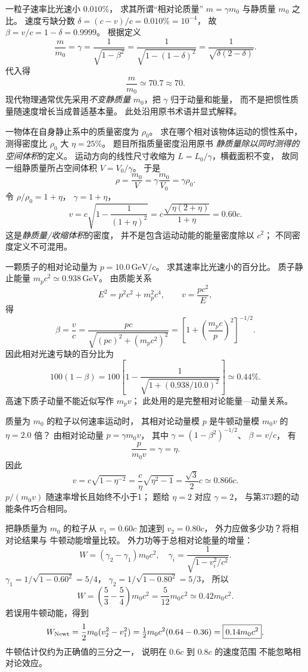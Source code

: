 一粒子速率比光速小 $0.010\%$，
求其所谓“相对论质量”
$m=\gamma m_0$ 与静质量 $m_0$ 之比。
\exsolution
速度亏缺分数
$\delta=(c-v)/c=0.010\%=10^{-4}$，
故 $\beta=v/c=1-\delta=0.9999$。
根据定义
\[
\frac{m}{m_0}=\gamma
=\frac1{\sqrt{1-\beta^2}}
=\frac1{\sqrt{1-(1-\delta)^2}}
=\frac1{\sqrt{\delta(2-\delta)}}.
\]
代入得
\[
\boxed{\frac{m}{m_0}\simeq70.7\approx70}.
\]
\excheck 现代物理通常优先采用\emph{不变静质量}
$m_0$，把 $\gamma$ 归于动量和能量，
而不是把惯性质量随速度增长当成普适基本量。
此处沿用原书术语并显式解释。

一物体在自身静止系中的质量密度为
$\rho_0$。
求在哪个相对该物体运动的惯性系中，
测得密度比 $\rho_0$ 大
$\eta=25\%$。
\exsolution
题目所指质量密度沿用原书
\emph{静质量除以同时测得的空间体积}的定义。
运动方向的线性尺寸收缩为
$L=L_0/\gamma$，横截面积不变，
故同一组静质量所占空间体积
$V=V_0/\gamma$。
于是
\[
\rho=\frac{m_0}{V}
=\gamma\frac{m_0}{V_0}=\gamma\rho_0.
\]
令 $\rho/\rho_0=1+\eta$，
$\gamma=1+\eta$，
\[
\boxed{v=c\sqrt{1-\frac1{(1+\eta)^2}}
=c\frac{\sqrt{\eta(2+\eta)}}{1+\eta}
=0.60c}.
\]
\excheck 这是\emph{静质量/收缩体积}的密度，
并不是包含运动动能的能量密度除以 $c^2$；
不同密度定义不可混用。

一颗质子的相对论动量为
$p=10.0\,\mathrm{GeV}/c$。
求其速率比光速小的百分比。
\exsolution
质子静止能量
$m_pc^2\simeq0.938\,\mathrm{GeV}$。
由质能关系
\[
E^2=p^2c^2+m_p^2c^4,\qquad v=\frac{pc^2}{E},
\]
得
\[
\beta=\frac vc
=\frac{pc}{\sqrt{(pc)^2+(m_pc^2)^2}}
=\left[1+\left(\frac{m_pc}{p}\right)^2\right]^{-1/2}.
\]
因此相对光速亏缺的百分比为
\[
\boxed{100(1-\beta)=100
\left[1-
\frac{1}{\sqrt{1+(0.938/10.0)^2}}\right]
\simeq0.44\%}.
\]
\excheck 高速下质子动量不能近似写作 $m_pv$；
此处用的是完整相对论能量—动量关系。

质量为 $m_0$ 的粒子以何速率运动时，
其相对论动量模 $p$ 是牛顿动量模
$m_0v$ 的 $\eta=2.0$ 倍？
\exsolution
由相对论动量
$p=\gamma m_0v$，
其中 $\gamma=(1-\beta^2)^{-1/2}$、
$\beta=v/c$，
有
\[
\frac{p}{m_0v}=\gamma=\eta.
\]
因此
\[
\boxed{v=c\sqrt{1-\eta^{-2}}
=\frac c\eta\sqrt{\eta^2-1}
=\frac{\sqrt3}{2}c\simeq0.866c}.
\]
\excheck $p/(m_0v)$ 随速率增长且始终不小于1；
题给 $\eta=2$ 对应 $\gamma=2$，
与第373题的动能条件巧合相同。

把静质量为 $m_0$ 的粒子从
$v_1=0.60c$ 加速到 $v_2=0.80c$，
外力应做多少功？将相对论结果与
牛顿动能增量比较。
\exsolution
外力功等于总相对论能量的增量：
\[
W=(\gamma_2-\gamma_1)m_0c^2,
\quad
\gamma_i=\frac1{\sqrt{1-v_i^2/c^2}}.
\]
$\gamma_1=1/\sqrt{1-0.60^2}=5/4$，
$\gamma_2=1/\sqrt{1-0.80^2}=5/3$，
所以
\[
\boxed{W=\left(\frac53-\frac54\right)m_0c^2
=\frac5{12}m_0c^2\simeq0.42m_0c^2}.
\]
若误用牛顿动能，得到
\[
W_{\rm Newt}=\frac12m_0(v_2^2-v_1^2)
=\tfrac12m_0c^2(0.64-0.36)
=\boxed{0.14m_0c^2}.
\]
\excheck 牛顿估计仅约为正确值的三分之一，
说明在 $0.6c$ 到 $0.8c$ 的速度范围
不能忽略相对论效应。

